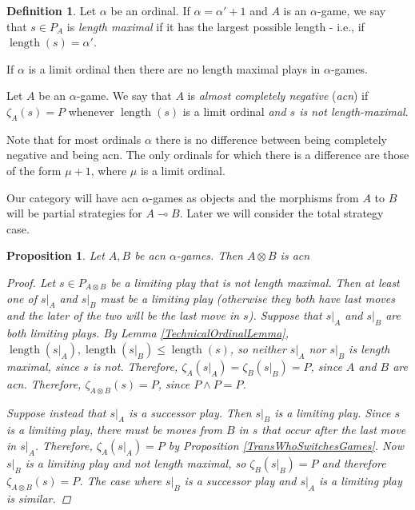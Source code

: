 \documentclass[11pt]{article} %
\theoremstyle{plain} %
\newtheorem{proposition}[theorem]{Proposition}
\theoremstyle{definition} %
\newtheorem{definition}[theorem]{Definition}
\theoremstyle{note}
\theoremstyle{exercisestyle}
\newcommand{\tensor}{\otimes}
\renewcommand{\implies}{\multimap}
\DeclareMathOperator{\length}{length}
\begin{document}
\begin{definition}
  Let $\alpha$ be an ordinal.  If $\alpha=\alpha'+1$ and $A$ is an $\alpha$-game, we say that $s\in P_A$ is \emph{length maximal} if it has the largest possible length - i.e., if $\length(s)=\alpha'$.  

  If $\alpha$ is a limit ordinal then there are no length maximal plays in $\alpha$-games.

  Let $A$ be an $\alpha$-game.  We say that $A$ is \emph{almost completely negative} (\emph{acn}) if $\zeta_A(s)=P$ whenever $\length(s)$ is a limit ordinal \emph{and $s$ is not length-maximal}.
\end{definition}

Note that for most ordinals $\alpha$ there is no difference between being completely negative and being acn.  The only ordinals for which there is  a difference are those of the form $\mu+1$, where $\mu$ is a limit ordinal.  

Our category will have acn $\alpha$-games as objects and the morphisms from $A$ to $B$ will be partial strategies for $A\implies B$.  Later we will consider the total strategy case.

\begin{proposition}
  \label{TensorIsAcn}
  Let $A,B$ be acn $\alpha$-games.  Then $A\tensor B$ is acn
  \begin{proof}
    Let $s\in P_{A\tensor B}$ be a limiting play that is not length maximal.  Then at least one of $s\vert_A$ and $s\vert_B$ must be a limiting play (otherwise they both have last moves and the later of the two will be the last move in $s$).  Suppose that $s\vert_A$ and $s\vert_B$ are both limiting plays.  By Lemma \ref{TechnicalOrdinalLemma}, $\length(s\vert_A),\length(s\vert_B)\le\length(s)$, so neither $s\vert_A$ nor $s\vert_B$ is length maximal, since $s$ is not.  Therefore, $\zeta_A(s\vert_A)=\zeta_B(s\vert_B)=P$, since $A$ and $B$ are acn.  Therefore, $\zeta_{A\tensor B}(s)=P$, since $P\wedge P=P$.

    Suppose instead that $s\vert_A$ is a successor play.  Then $s\vert_B$ is a limiting play.  Since $s$ is a limiting play, there must be moves from $B$ in $s$ that occur after the last move in $s\vert_A$.  Therefore, $\zeta_A(s\vert_A)=P$ by Proposition \ref{TransWhoSwitchesGames}.  Now $s\vert_B$ is a limiting play and not length maximal, so $\zeta_B(s\vert_B)=P$ and therefore $\zeta_{A\tensor B}(s)=P$.  The case where $s\vert_B$ is a successor play and $s\vert_A$ is a limiting play is similar.
  \end{proof}
\end{proposition}
\end{document}
